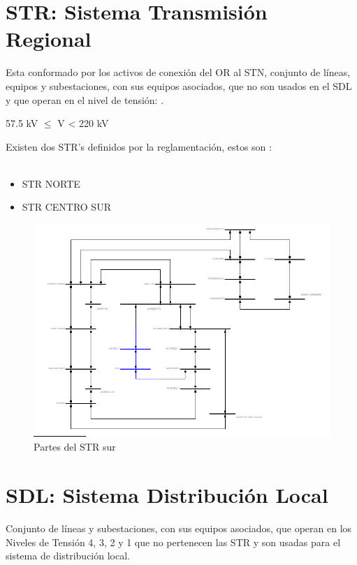 \documentclass[a5paper]{book}%
\begin{document}
\section{STR: Sistema Transmisión Regional}
Esta conformado por los activos de conexión del \ac{OR} al \ac{STN}, conjunto de líneas, equipos y
subestaciones, con sus equipos asociados,  que no son usados en el \ac{SDL} y que operan en el nivel de tensión:
\cite{XM-2018-1}.

\begin{center}

  \begin{tcolorbox}[ title=STR:Nivel de tensión 4]
    {57.5 kV $\leq$ V < 220 kV }
\end{tcolorbox}
\end{center}

Existen dos \ac{STR}'s definidos por la reglamentación, estos son
:\\\\

\begin{itemize}
\item STR NORTE
\item STR CENTRO SUR
\end{itemize}

\begin{figure}[H]
  \caption{Partes del STR sur}
  \includegraphics[width=\linewidth]{str}
\end{figure}
\section{SDL: Sistema Distribución Local}
Conjunto de líneas y subestaciones, con sus equipos asociados, que operan en los Niveles de Tensión 4, 3, 2 y 1 que no pertenecen las \ac{STR} y son usadas para el sistema de distribución local.
\end{document}
